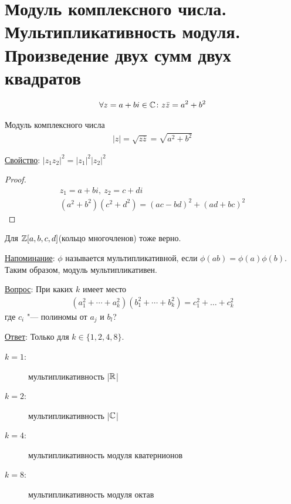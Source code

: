 \section{Модуль комплексного числа. Мультипликативность модуля. Произведение двух сумм двух квадратов}
\begin{gather*}
\forall z = a+bi \in \mathbb{C}\colon z\bar z = a^2 + b^2 
\end{gather*}
\begin{Def}
Модуль комплексного числа
\begin{gather*}
|z| = \sqrt{z\overline{z}} = \sqrt{a^2 + b^2}
\end{gather*}
\end{Def}

\underline{Свойство}: $|z_1z_2|^2 = |z_1|^2|z_2|^2$
\begin{proof}
\begin{gather*}
z_1 = a + bi,~z_2 = c + di \\
(a^2 + b^2)(c^2 + d^2) = (ac - bd)^2 + (ad + bc)^2
\end{gather*}
\end{proof}
\begin{Rem}
	Для $\mathbb{Z}[a, b, c, d]$(кольцо многочленов) тоже верно.
\end{Rem}

\underline{Напоминание}: $\phi$ называется мультипликативной, если $\phi(ab) = \phi(a)\phi(b)$. Таким образом, модуль мультипликативен.

\underline{Вопрос}: При каких $k$ имеет место
\begin{gather*}
(a_1^2 + \cdots + a_k^2)(b_1^2 + \cdots + b_k^2) = c_1^2 + \dots + c_k^2
\end{gather*}
где $c_i$ "--- полиномы от $a_j$ и $b_l$?

\underline{Ответ}: Только для $k \in \{1, 2, 4, 8\}$.
\begin{description}
\item[$k = 1$:] мультипликативность |$\mathbb{R}$|
\item[$k = 2$:] мультипликативность |$\mathbb{C}$|
\item[$k = 4$:] мультипликативность модуля кватернионов
\item[$k = 8$:] мультипликативность модуля октав
\end{description}
